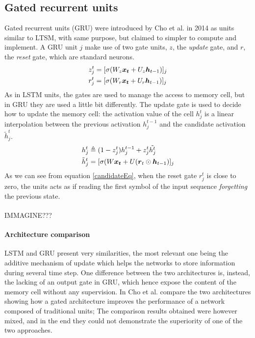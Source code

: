  
\subsection{Gated recurrent units}

Gated recurrent units (GRU) were introduced by Cho et al. in 2014 \cite{gru} as units similar to LTSM, with same purpose, 
but claimed to simpler to compute and implement. A GRU unit $j$ make use of two gate units, $z$, the 
\textit{update} gate, and $r$, the \textit{reset} gate, which are standard neurons.
\begin{align}
 &z_j^t = [\sigma(W_z\boldsymbol{x_t} + U_z\boldsymbol{h}_{t-1})]_j\\
 &r_j^t = [\sigma(W_r\boldsymbol{x_t} + U_r\boldsymbol{h}_{t-1})]_j\\
\end{align}
As in LSTM units, the gates are used to manage the access to memory cell, but in GRU they are used a little bit 
differently. The update gate is used to decide how to update the memory cell: the activation value of the cell 
$h_j^{t}$ is a linear interpolation between the previous activation $h_j^{t-1}$ and the candidate activation 
$\tilde{h}_j^t$.
\begin{align}
 &h_j^t \triangleq (1-z_j^t)h_j^{t-1} + z_j^t\tilde{h^t_j}\\
  \label{candidateEq}
 &\tilde{h}_j^t = [\sigma(W\boldsymbol{x_t} + U(\boldsymbol{r}_t \odot \boldsymbol{h}_{t-1})]_j
\end{align}
As we can see from equation \ref{candidateEq}, when the reset gate $r_j^t$ is close to zero, the units acts as if 
reading the first symbol of the input sequence \textit{forgetting} the previous state.
\\\\
IMMAGINE???

\paragraph{Architecture comparison}
LSTM and GRU present very similarities, the most relevant one being the additive mechanism of update which helps the 
networks to store information during several time step. One difference between the two architectures is, instead, the 
lacking of an output gate in GRU, which hence expose the content of the memory cell without any supervision. In 
\cite{gru_lstm_empirical} Cho et al. compare the two architectures showing how a gated architecture improves the 
performance of a network composed of traditional units; The comparison results obtained were however mixed, and in the 
end they could not demonstrate the superiority of one of the two approaches.

